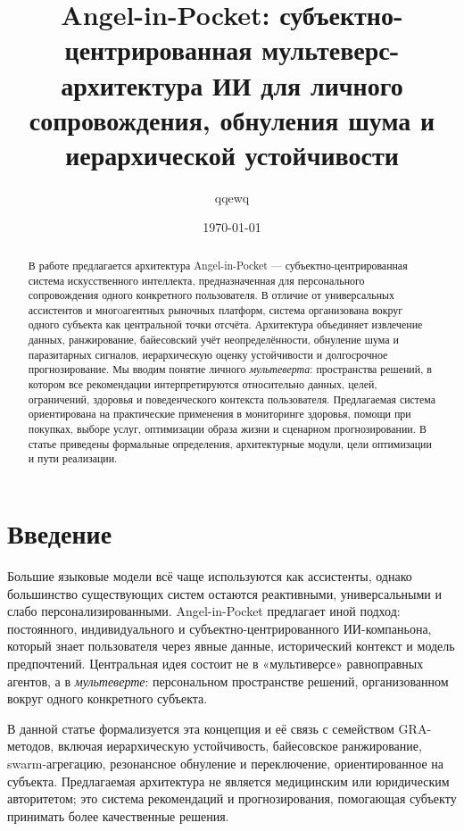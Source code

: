 \documentclass[11pt,a4paper]{article}
\title{Angel-in-Pocket: субъектно-центрированная мультеверс-архитектура ИИ для личного сопровождения, обнуления шума и иерархической устойчивости}
\author{qqewq}
\date{\today}
\begin{document}
\maketitle

\begin{abstract}
В работе предлагается архитектура Angel-in-Pocket — субъектно-центрированная система искусственного интеллекта, предназначенная для персонального сопровождения одного конкретного пользователя. В отличие от универсальных ассистентов и многoагентных рыночных платформ, система организована вокруг одного субъекта как центральной точки отсчёта. Архитектура объединяет извлечение данных, ранжирование, байесовский учёт неопределённости, обнуление шума и паразитарных сигналов, иерархическую оценку устойчивости и долгосрочное прогнозирование. Мы вводим понятие личного \emph{мультеверта}: пространства решений, в котором все рекомендации интерпретируются относительно данных, целей, ограничений, здоровья и поведенческого контекста пользователя. Предлагаемая система ориентирована на практические применения в мониторинге здоровья, помощи при покупках, выборе услуг, оптимизации образа жизни и сценарном прогнозировании. В статье приведены формальные определения, архитектурные модули, цели оптимизации и пути реализации.
\end{abstract}

\section{Введение}

Большие языковые модели всё чаще используются как ассистенты, однако большинство существующих систем остаются реактивными, универсальными и слабо персонализированными. Angel-in-Pocket предлагает иной подход: постоянного, индивидуального и субъектно-центрированного ИИ-компаньона, который знает пользователя через явные данные, исторический контекст и модель предпочтений. Центральная идея состоит не в «мультиверсе» равноправных агентов, а в \emph{мультеверте}: персональном пространстве решений, организованном вокруг одного конкретного субъекта.

В данной статье формализуется эта концепция и её связь с семейством GRA-методов, включая иерархическую устойчивость, байесовское ранжирование, swarm-агрегацию, резонансное обнуление и переключение, ориентированное на субъекта. Предлагаемая архитектура не является медицинским или юридическим авторитетом; это система рекомендаций и прогнозирования, помогающая субъекту принимать более качественные решения.
\end{document}
